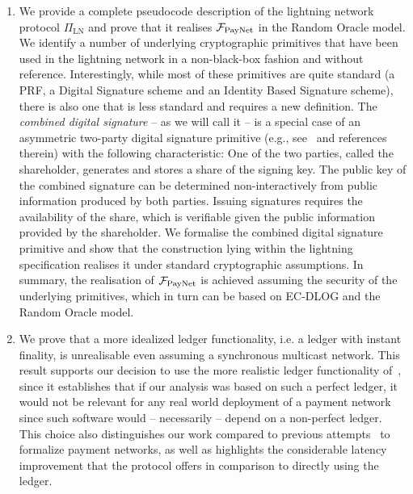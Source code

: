\begin{enumerate}
\item We provide a complete pseudocode description of the lightning network
protocol $\Pi_{\mathrm{LN}}$ and prove that it realises $\mathcal{F}_{\mathrm{PayNet}}{}$ in
the Random Oracle model. We identify a number of underlying cryptographic
primitives that have been used in the lightning network in
a non-black-box fashion and without reference. Interestingly, while
most of these primitives are quite standard (a PRF, a Digital Signature
scheme and an Identity Based Signature scheme), there is also one that is less standard  and requires a new definition. The \emph{combined digital signature} -- as we
will call it -- is a special case of an asymmetric two-party digital
signature primitive (e.g., see~\cite{DBLP:conf/ndss/NicolosiKDM03} and
references therein) with the following characteristic: One of
the two parties, called the shareholder, generates and stores a share of the signing
key. The public key of the combined signature can be
determined non-interactively from public information produced by both
parties. Issuing signatures requires the availability of the share,
which is verifiable given the public information provided by the shareholder. We
formalise the combined digital signature primitive and show that the
construction lying within the lightning specification realises
it under standard cryptographic assumptions. In summary, the realisation of
$\mathcal{F}_{\mathrm{PayNet}}{}$ is achieved assuming the security of the underlying
primitives, which in turn can be based on EC-DLOG and the Random Oracle
model.

\item We prove that a more idealized ledger functionality, i.e. a ledger with
instant finality, is unrealisable even assuming a synchronous multicast network.
This result supports our decision to use the more realistic ledger functionality
of~\cite{BMTZ17}, since it establishes that if our analysis was based on such a
perfect ledger, it would not be relevant for any real world deployment of a
payment network since such software would -- necessarily -- depend on a
non-perfect ledger. This choice also distinguishes our work compared to previous
attempts~\cite{DBLP:conf/ccs/DziembowskiFH18,Malavolta:2017:CPP:3133956.3134096,sprites,perun}
to formalize payment networks, as well as highlights the considerable
latency improvement that the  protocol offers in comparison to directly
using the ledger.
\end{enumerate}

